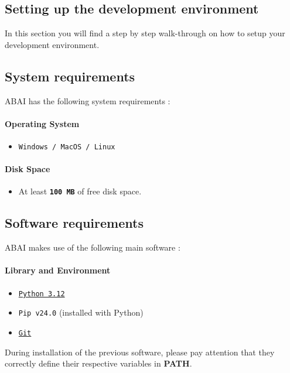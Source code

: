 \label{sec:setup-guide}
\subsection{Setting up the development environment}
In this section you will find a step by step walk-through on how to setup your development environment.

\subsection{System requirements}
ABAI has the following system requirements :

\paragraph{\fontsize{14}{17}\selectfont Operating System}
\begin{itemize}[label=\textbullet]
    \item \texttt{Windows / MacOS / Linux}
\end{itemize}

\paragraph{\fontsize{14}{17}\selectfont Disk Space}
\begin{itemize}
    \item At least \texttt{\textbf{100 MB}} of free disk space.
\end{itemize}

\subsection{Software requirements}

ABAI makes use of the following main software :

\paragraph{\fontsize{14}{17}\selectfont Library and Environment}
\begin{itemize}[label=\textbullet]
    \item \href{https://www.python.org/}{\texttt{Python 3.12}}
    \item \texttt{Pip v24.0} (installed with Python)
    \item \href{https://git-scm.com/}{\texttt{Git}}
\end{itemize}
During installation of the previous software, please pay attention that they correctly define their respective variables in \textbf{PATH}.

